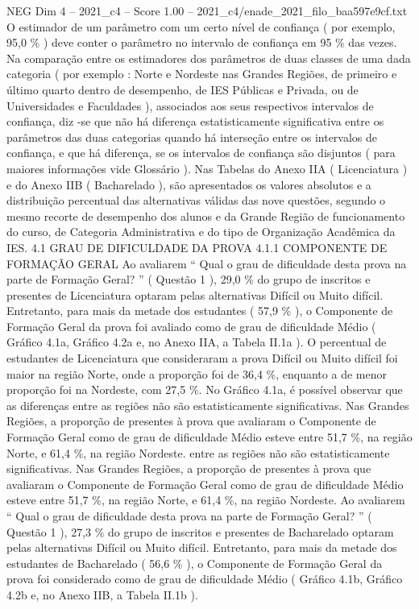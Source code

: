 \begin{textsample}{NEG Dim 4 – 2021\_c4 – Score 1.00 – 2021\_c4/enade\_2021\_filo\_baa597e9cf.txt}
O estimador de um parâmetro com um certo nível de confiança ( por exemplo, 95,0 \% ) deve conter o parâmetro no intervalo de confiança em 95 \% das vezes.
Na comparação entre os estimadores dos parâmetros de duas classes de uma dada categoria ( por exemplo : Norte e Nordeste nas Grandes Regiões, de primeiro e último quarto dentro de desempenho, de IES Públicas e Privada, ou de Universidades e Faculdades ), associados aos seus respectivos intervalos de confiança, diz -se que não há diferença estatisticamente significativa entre os parâmetros das duas categorias quando há interseção entre os intervalos de confiança, e que há diferença, se os intervalos de confiança são disjuntos ( para maiores informações vide Glossário ).
Nas Tabelas do Anexo IIA ( Licenciatura ) e do Anexo IIB ( Bacharelado ), são apresentados os valores absolutos e a distribuição percentual das alternativas válidas das nove questões, segundo o mesmo recorte de desempenho dos alunos e da Grande Região de funcionamento do curso, de Categoria Administrativa e do tipo de Organização Acadêmica da IES. 4.1 GRAU DE DIFICULDADE DA PROVA 4.1.1 COMPONENTE DE FORMAÇÃO GERAL Ao avaliarem “ Qual o grau de dificuldade desta prova na parte de Formação Geral? ” ( Questão 1 ), 29,0 \% do grupo de inscritos e presentes de Licenciatura optaram pelas alternativas Difícil ou Muito difícil.
Entretanto, para mais da metade dos estudantes ( 57,9 \% ), o Componente de Formação Geral da prova foi avaliado como de grau de dificuldade Médio ( Gráfico 4.1a, Gráfico 4.2a e, no Anexo IIA, a Tabela II.1a ).
O percentual de estudantes de Licenciatura que consideraram a prova Difícil ou Muito difícil foi maior na região Norte, onde a proporção foi de 36,4 \%, enquanto a de menor proporção foi na Nordeste, com 27,5 \%.
No Gráfico 4.1a, é possível observar que as diferenças entre as regiões não são estatisticamente significativas.
Nas Grandes Regiões, a proporção de presentes à prova que avaliaram o Componente de Formação Geral como de grau de dificuldade Médio esteve entre 51,7 \%, na região Norte, e 61,4 \%, na região Nordeste. entre as regiões não são estatisticamente significativas.
Nas Grandes Regiões, a proporção de presentes à prova que avaliaram o Componente de Formação Geral como de grau de dificuldade Médio esteve entre 51,7 \%, na região Norte, e 61,4 \%, na região Nordeste.
Ao avaliarem “ Qual o grau de dificuldade desta prova na parte de Formação Geral? ” ( Questão 1 ), 27,3 \% do grupo de inscritos e presentes de Bacharelado optaram pelas alternativas Difícil ou Muito difícil.
Entretanto, para mais da metade dos estudantes de Bacharelado ( 56,6 \% ), o Componente de Formação Geral da prova foi considerado como de grau de dificuldade Médio ( Gráfico 4.1b, Gráfico 4.2b e, no Anexo IIB, a Tabela II.1b ).

\end{textsample}
